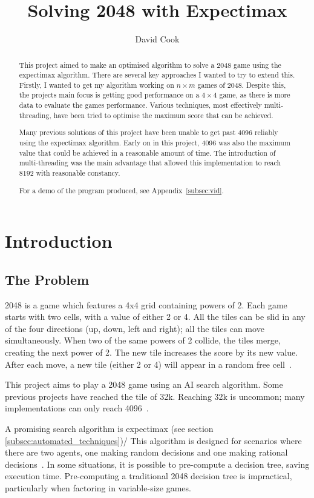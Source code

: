 \documentclass{article}
\title{Solving 2048 with Expectimax}
\author{David Cook}
\begin{document}
\maketitle
\newpage
\tableofcontents
\newpage
\begin{abstract}
This project aimed to make an optimised algorithm to solve a 2048 game using the expectimax algorithm. There are several key approaches I wanted to try to extend this. Firstly, I wanted to get my algorithm working on $n \times m$ games of 2048. Despite this, the project\textquotesingle s main focus is getting good performance on a $4 \times 4$ game, as there is more data to evaluate the game\textquotesingle s performance. Various techniques, most effectively multi-threading, have been tried to optimise the maximum score that can be achieved.

Many previous solutions of this project have been unable to get past 4096 reliably using the expectimax algorithm. Early on in this project, 4096 was also the maximum value that could be achieved in a reasonable amount of time. The introduction of multi-threading was the main advantage that allowed this implementation to reach 8192 with reasonable constancy.

For a demo of the program produced, see Appendix~\ref{subsec:vid}.
\end{abstract}
\section{Introduction}
\label{sec:intro}
\subsection{The Problem}
\label{subsec:problem}
2048 is a game which features a 4x4 grid containing powers of 2. Each game starts with two cells, with a value of either 2 or 4.
All the tiles can be slid in any of the four directions (up, down, left and right); all the tiles can move simultaneously. When two of the same powers of 2 collide, the tiles merge, creating the next power of 2. The new tile increases the score by its new value. After each move, a new tile (either 2 or 4) will appear in a random free cell~\cite{game2048}.

This project aims to play a 2048 game using an AI search algorithm. Some previous projects have reached the tile of 32k\cite{_16k2048ai}. Reaching 32k is uncommon; many implementations can only reach 4096~\cite{aiplays2048,expectimax2048}.

A promising search algorithm is expectimax (see section \ref{subsec:automated_techniques})/ This algorithm is designed for scenarios where there are two agents, one making random decisions and one making rational decisions~\cite[~p.200]{russell2010artificial}. In some situations, it is possible to pre-compute a decision tree, saving execution time.
Pre-computing a traditional 2048 decision tree is impractical, particularly when factoring in variable-size games.
\end{document}
